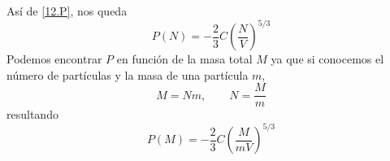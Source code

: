 \begin{sol}
\begin{equation}
\end{equation}
Así de \eqref{12.P}, nos queda
\begin{equation}
  \boxed{P(N)=-\frac{2}{3}C\left(\frac{N}{V}\right)^{5/3}}
\end{equation}
Podemos encontrar $P$ en función de la masa total $M$ ya que si conocemos el número de partículas y la masa de una partícula $m$, 
\begin{equation}
  M=Nm,\qquad  N=\frac{M}{m}
\end{equation}
resultando
\begin{equation}
 \boxed{ P(M)=-\frac{2}{3}C\left(\frac{M}{mV}\right)^{5/3}}
\end{equation}
\end{sol}





































